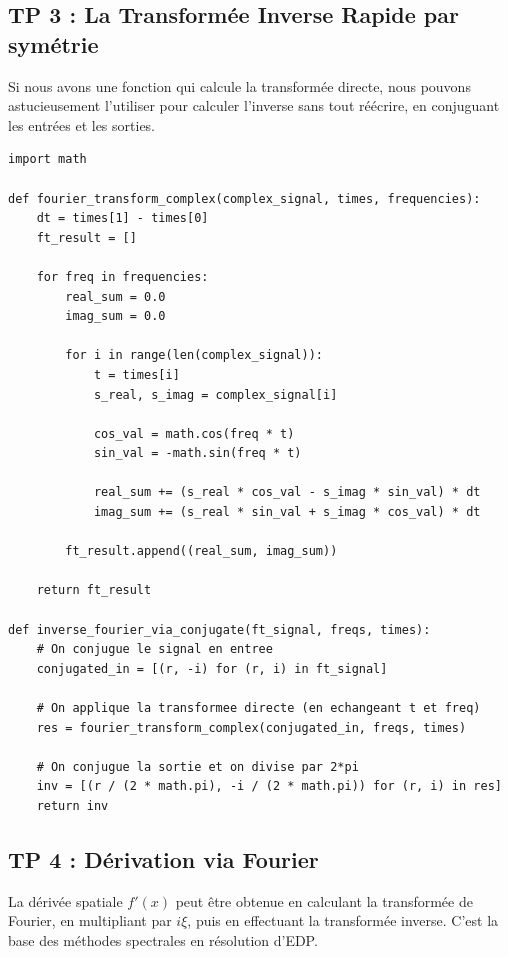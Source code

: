 \documentclass[11pt,a4paper]{article}
\begin{document}
\subsection*{TP 3 : La Transformée Inverse Rapide par symétrie}

Si nous avons une fonction qui calcule la transformée directe, nous pouvons astucieusement l'utiliser pour calculer l'inverse sans tout réécrire, en conjuguant les entrées et les sorties.

\begin{lstlisting}
import math

def fourier_transform_complex(complex_signal, times, frequencies):
    dt = times[1] - times[0]
    ft_result = []

    for freq in frequencies:
        real_sum = 0.0
        imag_sum = 0.0

        for i in range(len(complex_signal)):
            t = times[i]
            s_real, s_imag = complex_signal[i]

            cos_val = math.cos(freq * t)
            sin_val = -math.sin(freq * t)

            real_sum += (s_real * cos_val - s_imag * sin_val) * dt
            imag_sum += (s_real * sin_val + s_imag * cos_val) * dt

        ft_result.append((real_sum, imag_sum))

    return ft_result

def inverse_fourier_via_conjugate(ft_signal, freqs, times):
    # On conjugue le signal en entree
    conjugated_in = [(r, -i) for (r, i) in ft_signal]

    # On applique la transformee directe (en echangeant t et freq)
    res = fourier_transform_complex(conjugated_in, freqs, times)

    # On conjugue la sortie et on divise par 2*pi
    inv = [(r / (2 * math.pi), -i / (2 * math.pi)) for (r, i) in res]
    return inv
\end{lstlisting}


\subsection*{TP 4 : Dérivation via Fourier}

La dérivée spatiale $f'(x)$ peut être obtenue en calculant la transformée de Fourier, en multipliant par $i\xi$, puis en effectuant la transformée inverse. C'est la base des méthodes spectrales en résolution d'EDP.
\end{document}
